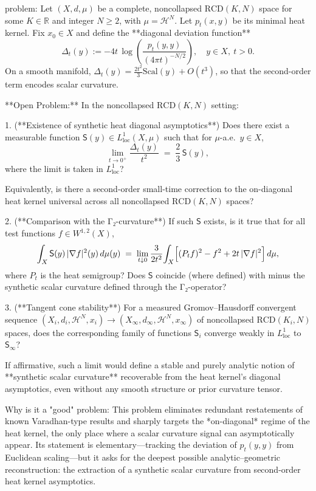 problem:  
Let \((X,d,\mu)\) be a complete, noncollapsed \(\mathrm{RCD}(K,N)\) space for some \(K\in\mathbb{R}\) and integer \(N\ge2\), with \(\mu=\mathcal{H}^N\).  Let \(p_t(x,y)\) be its minimal heat kernel.  
Fix \(x_0\in X\) and define the **diagonal deviation function**
\[
\Delta_t(y) := -4t\,\log\!\left(\frac{p_t(y,y)}{(4\pi t)^{-N/2}}\right),
\quad y\in X,\ t>0.
\]
On a smooth manifold, \(\Delta_t(y)=\tfrac{2t^2}{3}\mathrm{Scal}(y)+O(t^3)\), so that the second-order term encodes scalar curvature.  

**Open Problem:**  
In the noncollapsed \(\mathrm{RCD}(K,N)\) setting:

1. (**Existence of synthetic heat diagonal asymptotics**)  
   Does there exist a measurable function \(\mathsf{S}(y)\in L^1_{\mathrm{loc}}(X,\mu)\) such that for \(\mu\)-a.e.\ \(y\in X\),
   \[
   \lim_{t\to0^+}\frac{\Delta_t(y)}{t^2}
        \;=\;\frac{2}{3}\,\mathsf{S}(y),
   \]
   where the limit is taken in \(L^1_{\mathrm{loc}}\)?  

   Equivalently, is there a second-order small-time correction to the on-diagonal heat kernel universal across all noncollapsed \(\mathrm{RCD}(K,N)\) spaces?

2. (**Comparison with the Γ₂-curvature**)  
   If such \(\mathsf{S}\) exists, is it true that for all test functions \(f\in W^{1,2}(X)\),
   \[
   \int_X \mathsf{S}(y)\,|\nabla f|^2(y)\,d\mu(y)
       \;=\;\lim_{t\downarrow0}\frac{3}{2t^2}
          \!\int_X\Bigl[(P_t f)^2 - f^2 + 2t\,|\nabla f|^2 \Bigr]\,d\mu,
   \]
   where \(P_t\) is the heat semigroup?
   Does \(\mathsf{S}\) coincide (where defined) with minus the synthetic scalar curvature defined through the Γ₂-operator?

3. (**Tangent cone stability**)  
   For a measured Gromov–Hausdorff convergent sequence \((X_i,d_i,\mathcal{H}^N,x_i)\to(X_\infty,d_\infty,\mathcal{H}^N,x_\infty)\) of noncollapsed \(\mathrm{RCD}(K_i,N)\) spaces, does the corresponding family of functions \(\mathsf{S}_i\) converge weakly in \(L^1_{\mathrm{loc}}\) to \(\mathsf{S}_\infty\)?  

If affirmative, such a limit would define a stable and purely analytic notion of **synthetic scalar curvature** recoverable from the heat kernel’s diagonal asymptotics, even without any smooth structure or prior curvature tensor.

Why is it a "good" problem:  
This problem eliminates redundant restatements of known Varadhan-type results and sharply targets the *on-diagonal* regime of the heat kernel, the only place where a scalar curvature signal can asymptotically appear. Its statement is elementary—tracking the deviation of \(p_t(y,y)\) from Euclidean scaling—but it asks for the deepest possible analytic–geometric reconstruction: the extraction of a synthetic scalar curvature from second-order heat kernel asymptotics.  

